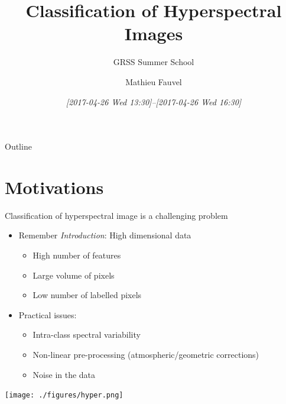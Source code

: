 \documentclass[10pt,aspectratio=1610]{beamer}
\author{Mathieu Fauvel}
\date{\textit{[2017-04-26 Wed 13:30]--[2017-04-26 Wed 16:30]}}
\title{Classification of Hyperspectral Images}
\subtitle{GRSS Summer School}
\institute{UMR Dynafor}
\begin{document}
\maketitle
\begin{frame}{Outline}
\tableofcontents
\end{frame}

\section{Motivations}
\label{sec:orgdbb0df2}
\begin{frame}[label={sec:orgb80edef}]{Classification of hyperspectral image is a challenging problem}
\begin{itemize}
\item Remember \emph{Introduction}: \alert{High dimensional data}
\begin{itemize}
\item High number of features
\item Large volume of pixels
\item Low number of labelled pixels
\end{itemize}
\item Practical issues:
\begin{itemize}
\item Intra-class spectral variability
\item Non-linear pre-processing (atmospheric/geometric corrections)
\item Noise in the data
\end{itemize}
\end{itemize}

\begin{center}
\begin{center}
\texttt{[image: ./figures/hyper.png]}
\end{center}
\end{center}
\end{frame}
\end{document}
